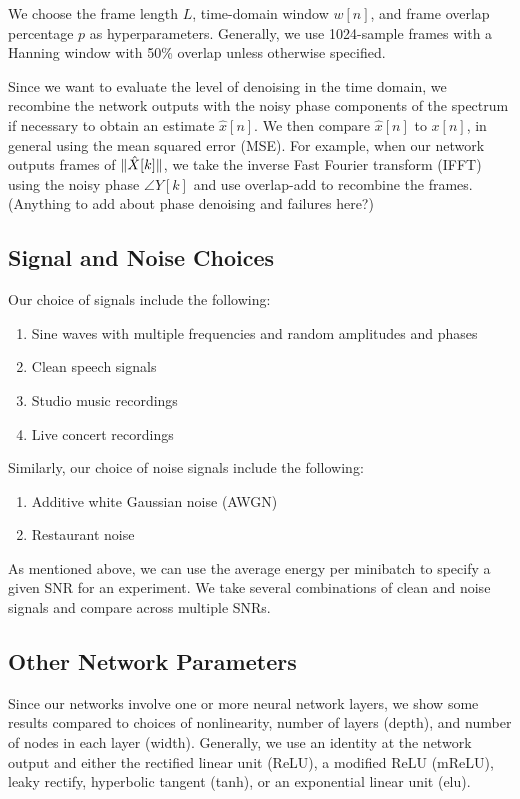 We choose the frame length $L$, time-domain window $w[n]$, and frame overlap percentage $p$ as hyperparameters. Generally, we use 1024-sample frames with a Hanning window with 50\% overlap unless otherwise specified.


Since we want to evaluate the level of denoising in the time domain, we recombine the network outputs with the noisy phase components of the spectrum if necessary to obtain an estimate $\hat{x}[n]$. We then compare $\hat{x}[n]$ to $x[n]$, in general using the mean squared error (MSE). For example, when our network outputs frames of $\lVert\hat{X}[k]\rVert$, we take the inverse Fast Fourier transform (IFFT) using the noisy phase $\angle{Y[k]}$ and use overlap-add to recombine the frames. (Anything to add about phase denoising and failures here?)

\subsection{Signal and Noise Choices}
Our choice of signals include the following:

\begin{enumerate}
    \item Sine waves with multiple frequencies and random amplitudes and phases
    \item Clean speech signals
    \item Studio music recordings
    \item Live concert recordings
\end{enumerate}

Similarly, our choice of noise signals include the following:

\begin{enumerate}
    \item Additive white Gaussian noise (AWGN)
    \item Restaurant noise
\end{enumerate}

As mentioned above, we can use the average energy per minibatch to specify a given SNR for an experiment. We take several combinations of clean and noise signals and compare across multiple SNRs.

\subsection{Other Network Parameters}
Since our networks involve one or more neural network layers, we show some results compared to choices of nonlinearity, number of layers (depth), and number of nodes in each layer (width). Generally, we use an identity at the network output and either the rectified linear unit (ReLU), a modified ReLU (mReLU), leaky rectify, hyperbolic tangent (tanh), or an exponential linear unit (elu).
